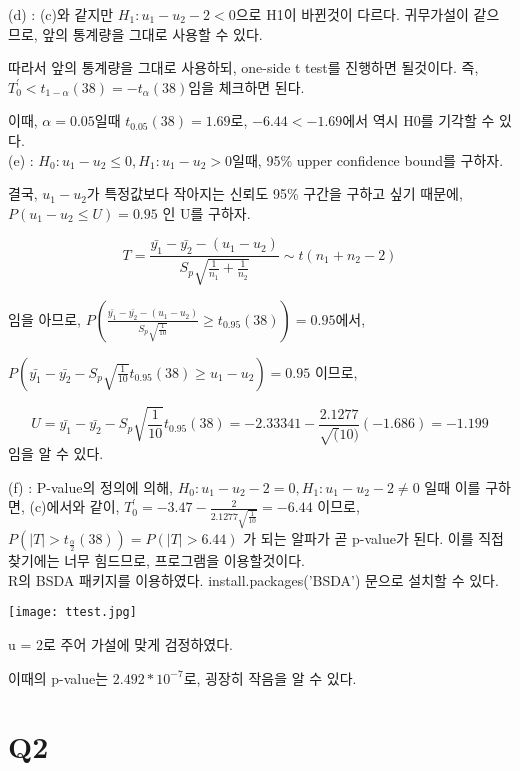 \documentclass{article}
\begin{document}
(d) : (c)와 같지만 $ H_1 : u_1 - u_2 - 2 < 0 $으로 H1이 바뀐것이 다르다. 
      귀무가설이 같으므로, 앞의 통계량을 그대로 사용할 수 있다.

      따라서 앞의 통계량을 그대로 사용하되,
      one-side t test를 진행하면 될것이다. 즉, $T_0^{'} < t_{1 - \alpha}(38) =  - t_{\alpha}(38) $임을 체크하면 된다.

이때, $\alpha = 0.05$일때  $ t_{0.05}(38) =  1.69$로, $-6.44 < -1.69$에서 역시 H0를 기각할 수 있다. \\


(e) : $ H_0 : u_1 - u_2 \le 0, H_1 : u_1 - u_2 > 0 $일때, 95\%  upper confidence bound를 구하자.

결국, $u_1 - u_2$가 특정값보다 작아지는 신뢰도 95\% 구간을 구하고 싶기 때문에, $P(u_1 - u_2 \le U) = 0.95$ 인 U를 구하자.

$$ T = \frac{\bar{y_1} - \bar{y_2} - (u_1 - u_2)}{S_p \sqrt{\frac{1}{n_1} + \frac{1}{n_2}}}  \sim t(n_1 + n_2 - 2)$$

임을 아므로, $P(\frac{\bar{y_1} - \bar{y_2} - (u_1 - u_2)}{S_p \sqrt{\frac{1}{10}}} \ge t_{0.95}(38)) = 0.95$에서,

$P(\bar{y_1} - \bar{y_2} - S_p \sqrt{\frac{1}{10}} t_{0.95}(38) \ge u_1 - u_2) = 0.95$ 이므로,

$$U = \bar{y_1} - \bar{y_2} - S_p \sqrt{\frac{1}{10}} t_{0.95}(38) = -2.33341 - \frac{2.1277}{\sqrt(10)} (-1.686) = -1.199 $$임을 알 수 있다.


(f) : P-value의 정의에 의해, $H_0 : u_1 - u_2 - 2 = 0, H_1 : u_1 - u_2 - 2 \neq 0 $ 일때 이를 구하면,
      (c)에서와 같이, $ T_0^{'} = -3.47 - \frac{2}{2.1277 \sqrt{\frac{1}{10}}} = -6.44 $ 이므로, 
     $P(|T| > t_{\frac{\alpha}{2}}(38)) = P(|T| > 6.44) $ 가 되는 알파가 곧 p-value가 된다.
      이를 직접 찾기에는 너무 힘드므로, 프로그램을 이용할것이다. \\


R의 BSDA 패키지를 이용하였다. install.packages('BSDA') 문으로 설치할 수 있다.

\begin{center}
    \texttt{[image: ttest.jpg]}
\end{center}

u = 2로 주어 가설에 맞게 검정하였다.

이때의 p-value는 $2.492 * 10^{-7}$로, 굉장히 작음을 알 수 있다.



\section{Q2}
\end{document}
